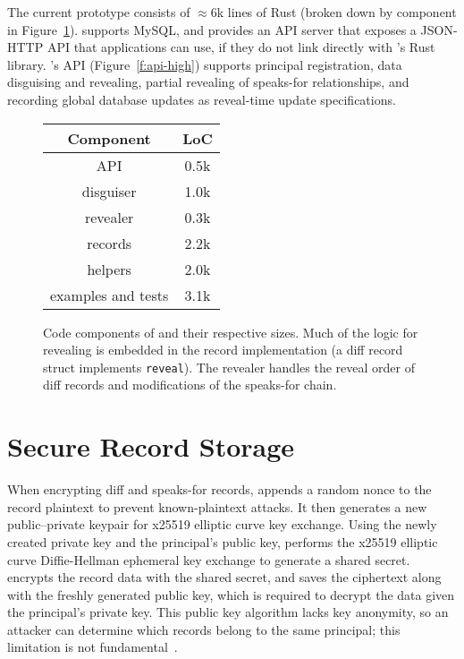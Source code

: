 
The current \sys prototype consists of $\approx6$k lines of Rust (broken down by component in
Figure~\ref{f:loc}). 
%
\sys supports MySQL, and provides an API server that exposes a JSON-HTTP API that applications
can use, if they do not link directly with \sys's Rust library.
%
\sys's API (Figure~\ref{f:api-high}) supports principal registration, data disguising and revealing,
partial revealing of speaks-for relationships, and recording global database
updates as reveal-time update specifications.
%

\begin{figure}[h]
\centering
\begin{tabular}{cc}
    \textbf{Component} & \textbf{LoC} \\
\hline
    API & 0.5k\\
    disguiser & 1.0k\\
    revealer & 0.3k \\
    records & 2.2k \\
    helpers & 2.0k \\
    examples and tests & 3.1k\\

\end{tabular}
    \caption[\sys's code components and LoC.]{Code components of \sys and their respective sizes. Much
    of the logic for revealing is embedded in the record implementation (\eg a
    diff record struct implements \texttt{reveal}). The revealer handles the
    reveal order of diff records and modifications of the speaks-for
    chain.} 
    \label{f:loc}
\end{figure}

%


\section{Secure Record Storage}
%
When encrypting diff and speaks-for records, \sys appends a random nonce to
the record plaintext to prevent known-plaintext attacks.
%
It then generates a new public--private keypair for x25519 elliptic curve key
exchange.
%
Using the newly created private key and the principal's public key, \sys
performs the x25519 elliptic curve Diffie-Hellman ephemeral key exchange to
generate a shared secret.
%
\sys encrypts the record data with the shared secret, and saves the ciphertext
along with the freshly generated public key, which is required to decrypt the
data given the principal's private key.
%
This public key algorithm lacks key anonymity, so an attacker can determine
which records belong to the same principal; this limitation is not
fundamental~\cite{anonymous-keys}.

